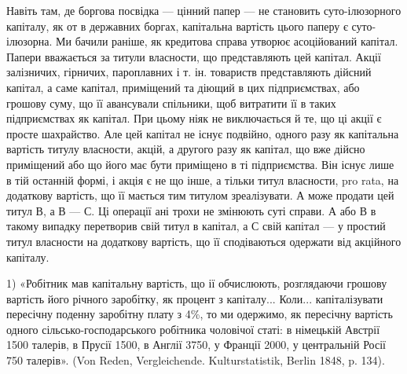 Навіть там, де боргова посвідка — цінний папер — не становить суто-ілюзорного
капіталу, як от в державних боргах, капітальна вартість цього
паперу є суто-ілюзорна. Ми бачили раніше, як кредитова справа утворює асоційований
капітал. Папери вважається за титули власности, що представляють
цей капітал. Акції залізничих, гірничих, пароплавних і т. ін. товариств представляють
дійсний капітал, а саме капітал, приміщений та діющий в цих
підприємствах, або грошову суму, що її авансували спільники, щоб витратити
її в таких підприємствах як капітал. При цьому ніяк не виключається й те,
що ці акції є просте шахрайство. Але цей капітал не існує подвійно, одного
разу як капітальна вартість титулу власности, акцій, а другого разу як капітал,
що вже дійсно приміщений або що його має бути приміщено в ті підприємства.
Він існує лише в тій останній формі, і акція є не що інше, а
тільки титул власности, pro rata, на додаткову вартість, що її мається тим
титулом зреалізувати. А може продати цей титул В, а В — С. Ці операції ані
трохи не змінюють суті справи. А або В в такому випадку перетворив свій
титул в капітал, а С свій капітал — у простий титул власности на додаткову
вартість, що її сподіваються одержати від акційного капіталу.

1) «Робітник мав капітальну вартість, що ії обчислюють, розглядаючи грошову вартість його
річного заробітку, як процент з капіталу... Коли... капіталізувати пересічну поденну заробітну
плату з 4\%, то ми одержимо, як пересічну вартість одного сільсько-господарського робітника чоловічої
статі: в німецькій Австрії 1500 талерів, в Прусії 1500, в Англії 3750, у Франції 2000, у
центральній Росії 750 талерів». (Von Reden, Vergleichende. Kulturstatistik, Berlin 1848, p. 134).
